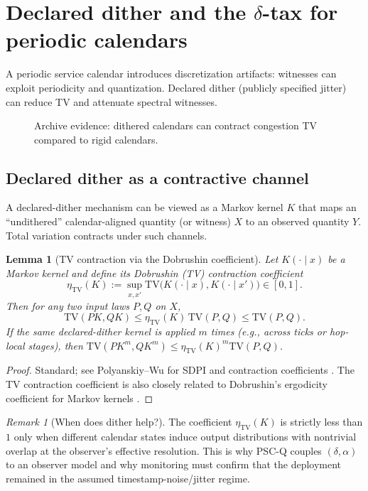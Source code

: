 \documentclass[11pt]{article}
\newtheorem{lemma}{Lemma}
\theoremstyle{definition}
\theoremstyle{remark}
\newtheorem{remark}{Remark}
\newcommand{\TV}{\mathrm{TV}}
\begin{document}
\section{Declared dither and the \texorpdfstring{$\delta$}{delta}-tax for periodic calendars}
A periodic service calendar introduces discretization artifacts: witnesses can exploit periodicity and quantization.
Declared dither (publicly specified jitter) can reduce TV and attenuate spectral witnesses.

\begin{figure}[t]
\centering
{}
\caption{Archive evidence: dithered calendars can contract congestion TV compared to rigid calendars.}
\label{fig:dither}
\end{figure}

\subsection{Declared dither as a contractive channel}
A declared-dither mechanism can be viewed as a Markov kernel \(K\) that maps an ``undithered'' calendar-aligned quantity (or witness) \(X\) to an observed quantity \(Y\).
Total variation contracts under such channels.

\begin{lemma}[TV contraction via the Dobrushin coefficient]\label{lem:dobrushin}
Let \(K(\cdot\mid x)\) be a Markov kernel and define its Dobrushin (TV) contraction coefficient
\[
\eta_{\TV}(K) := \sup_{x,x'} \TV\big(K(\cdot\mid x),K(\cdot\mid x')\big)\in[0,1].
\]
Then for any two input laws \(P,Q\) on \(X\),
\[
\TV(PK,QK)\le \eta_{\TV}(K)\,\TV(P,Q)\le \TV(P,Q).
\]
If the same declared-dither kernel is applied \(m\) times (e.g., across ticks or hop-local stages), then
\(\TV(PK^{m},QK^{m})\le \eta_{\TV}(K)^{m}\TV(P,Q)\).
\end{lemma}

\begin{proof}
Standard; see Polyanskiy--Wu for SDPI and contraction coefficients \cite{polyanskiy_wu_sdpi}.
The TV contraction coefficient is also closely related to Dobrushin's ergodicity coefficient for Markov kernels \cite{dobrushin1956,delmoral2003}.
\end{proof}

\begin{remark}[When does dither help?]
The coefficient \(\eta_{\TV}(K)\) is strictly less than \(1\) only when different calendar states induce output distributions with nontrivial overlap at the observer's effective resolution.
This is why PSC-Q couples \((\delta,\alpha)\) to an observer model and why monitoring must confirm that the deployment remained in the assumed timestamp-noise/jitter regime.
\end{remark}
\end{document}
